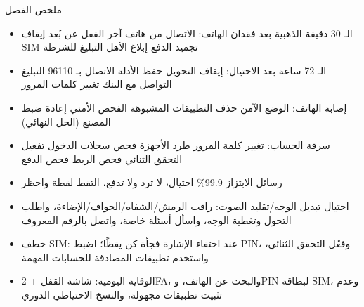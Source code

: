 \begin{tcbsummary}{ملخص الفصل}
\begin{itemize}
  \item الـ 30 دقيقة الذهبية بعد فقدان الهاتف: الاتصال من هاتف آخر القفل عن بُعد إيقاف SIM تجميد الدفع إبلاغ الأهل التبليغ للشرطة
  \item الـ 72 ساعة بعد الاحتيال: إيقاف التحويل حفظ الأدلة الاتصال بـ 96110 التبليغ التواصل مع البنك تغيير كلمات المرور
  \item إصابة الهاتف: الوضع الآمن حذف التطبيقات المشبوهة الفحص الأمني إعادة ضبط المصنع (الحل النهائي)
  \item سرقة الحساب: تغيير كلمة المرور طرد الأجهزة فحص سجلات الدخول تفعيل التحقق الثنائي فحص الربط فحص الدفع
  \item رسائل الابتزاز 99.9\% احتيال، لا ترد ولا تدفع، التقط لقطة واحظر
  \item احتيال تبديل الوجه/تقليد الصوت: راقب الرمش/الشفاه/الحواف/الإضاءة، واطلب التحول وتغطية الوجه، واسأل أسئلة خاصة، واتصل بالرقم المعروف
  \item خطف SIM: عند اختفاء الإشارة فجأة كن يقظًا؛ اضبط PIN، وفعّل التحقق الثنائي، واستخدم تطبيقات المصادقة للحسابات المهمة
  \item الوقاية اليومية: شاشة القفل + 2FA، والبحث عن الهاتف، وPIN لبطاقة SIM، وعدم تثبيت تطبيقات مجهولة، والنسخ الاحتياطي الدوري
\end{itemize}

\end{tcbsummary}
